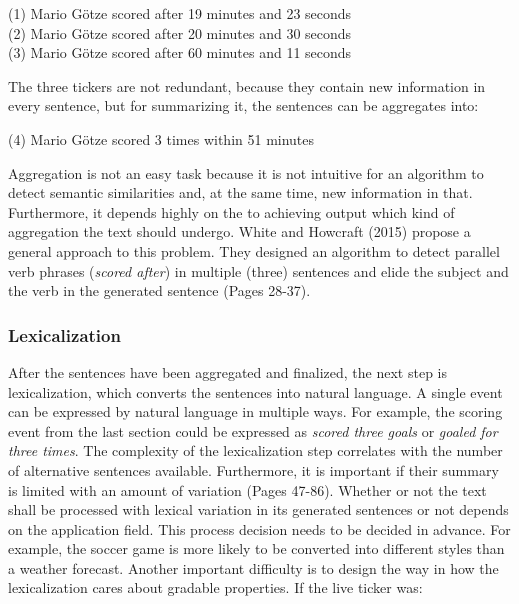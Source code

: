 \begin{tcolorbox}
	\begin{center}
		(1) Mario Götze scored after 19 minutes and 23 seconds \\
		(2) Mario Götze scored after 20 minutes and 30 seconds \\
		(3) Mario Götze scored after 60 minutes and 11 seconds
	\end{center}
\end{tcolorbox}

The three tickers are not redundant, because they contain new information in every sentence, but for summarizing it, the sentences can be aggregates into:

\begin{tcolorbox}
	\begin{center}
		(4) Mario Götze scored 3 times within 51 minutes
	\end{center}
\end{tcolorbox}

Aggregation is not an easy task because it is not intuitive for an algorithm to detect semantic similarities and, at the same time, new information in that. Furthermore, it depends highly on the to achieving output which kind of aggregation the text should undergo. White and Howcraft (2015) propose a general approach to this problem. They designed an algorithm to detect parallel verb phrases (\textit{scored after}) in multiple (three) sentences and elide the subject and the verb in the generated sentence \cite{white-howcroft-2015-inducing} (Pages 28-37). 

\subsubsection{Lexicalization}\label{ss:lex}

After the sentences have been aggregated and finalized, the next step is lexicalization, which converts the sentences into natural language. A single event can be expressed by natural language in multiple ways. For example, the scoring event from the last section could be expressed as \textit{scored three goals} or \textit{goaled for three times}. The complexity of the lexicalization step correlates with the number of alternative sentences available. Furthermore, it is important if their summary is limited with an amount of variation \cite{Theune} (Pages 47-86). Whether or not the text shall be processed with lexical variation in its generated sentences or not depends on the application field. This process decision needs to be decided in advance. For example, the soccer game is more likely to be converted into different styles than a weather forecast. Another important difficulty is to design the way in how the lexicalization cares about gradable properties. If the live ticker was:

